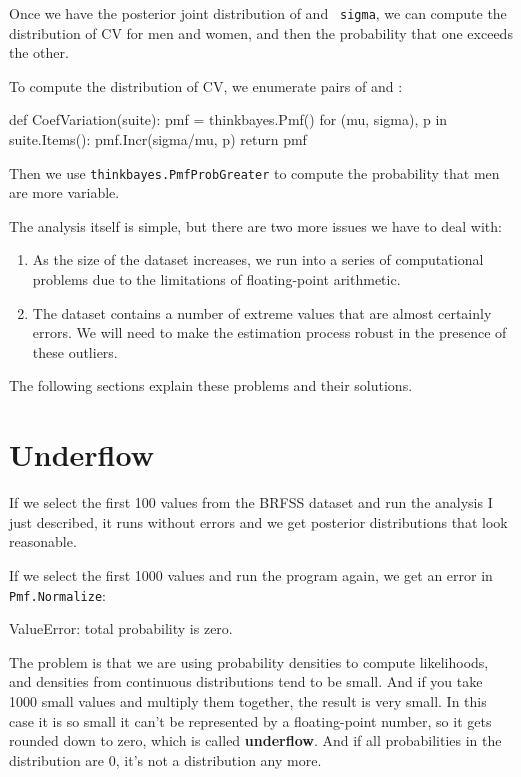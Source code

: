 \documentclass[12pt]{book}
\theoremstyle{exercise}
\begin{document}
Once we have the posterior joint distribution of  and {\tt
  sigma}, we can compute the distribution of CV for men and women, and
then the probability that one exceeds the other.

To compute the distribution of CV, we enumerate pairs of
 and :

\begin{code}
def CoefVariation(suite):
    pmf = thinkbayes.Pmf()
    for (mu, sigma), p in suite.Items():
        pmf.Incr(sigma/mu, p)
    return pmf
\end{code}

Then we use \verb"thinkbayes.PmfProbGreater" to compute the
probability that men are more variable.

The analysis itself is simple, but there are two more issues we
have to deal with:

\begin{enumerate}

\item As the size of the dataset increases, we run into a series of
  computational problems due to the limitations of floating-point
  arithmetic.

\item The dataset contains a number of extreme values that are almost
  certainly errors.  We will need to make the estimation process
  robust in the presence of these outliers.

\end{enumerate}

The following sections explain these problems and their solutions.


\section{Underflow}
\label{underflow}

If we select the first 100 values from the BRFSS dataset and run the
analysis I just described, it runs without errors and we get posterior
distributions that look reasonable.

If we select the first 1000 values and run the program again, we get
an error in \verb"Pmf.Normalize":

\begin{code}
ValueError: total probability is zero.
\end{code}

The problem is that we are using probability densities to compute
likelihoods, and densities from continuous distributions tend to be
small.  And if you take 1000 small values and multiply
them together, the result is very small.  In this case it is so small
it can't be represented by a floating-point number, so it gets rounded
down to zero, which is called {\bf underflow}.  And if all
probabilities in the distribution are 0, it's not a distribution any
more.
\end{document}
